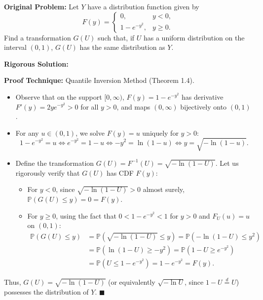 \documentclass[11pt, letterpaper]{article}
\theoremstyle{definition}
\theoremstyle{remark}
\newcommand{\Prob}{\mathbb{P}}
\begin{document}
\textbf{Original Problem:}
Let $Y$ have a distribution function given by
\[
    F(y) = \begin{cases} 0, & y < 0, \\ 1 - e^{-y^2}, & y \ge 0. \end{cases}
\]
Find a transformation $G(U)$ such that, if $U$ has a uniform distribution on the interval $(0, 1)$, $G(U)$ has the same distribution as $Y$.

\hrulefill

\textbf{Rigorous Solution:}

\textbf{Proof Technique:} Quantile Inversion Method (Theorem 1.4).
\begin{itemize}
    \item Observe that on the support $[0, \infty)$, $F(y) = 1 - e^{-y^2}$ has derivative $F'(y) = 2y e^{-y^2} > 0$ for all $y > 0$, and maps $(0, \infty)$ bijectively onto $(0, 1)$.
    \item For any $u \in (0, 1)$, we solve $F(y) = u$ uniquely for $y > 0$:
    \[
        1 - e^{-y^2} = u \iff e^{-y^2} = 1 - u \iff -y^2 = \ln(1 - u) \iff y = \sqrt{-\ln(1 - u)}.
    \]
    \item Define the transformation $G(U) = F^{-1}(U) = \sqrt{-\ln(1 - U)}$. Let us rigorously verify that $G(U)$ has CDF $F(y)$:
    \begin{itemize}
        \item For $y < 0$, since $\sqrt{-\ln(1 - U)} > 0$ almost surely, $\Prob(G(U) \le y) = 0 = F(y)$.
        \item For $y \ge 0$, using the fact that $0 < 1 - e^{-y^2} < 1$ for $y > 0$ and $F_U(u) = u$ on $(0, 1)$:
        \begin{align*}
            \Prob(G(U) \le y) &= \Prob\left(\sqrt{-\ln(1 - U)} \le y\right) = \Prob\left(-\ln(1 - U) \le y^2\right) \\
            &= \Prob\left(\ln(1 - U) \ge -y^2\right) = \Prob\left(1 - U \ge e^{-y^2}\right) \\
            &= \Prob\left(U \le 1 - e^{-y^2}\right) = 1 - e^{-y^2} = F(y).
        \end{align*}
    \end{itemize}
\end{itemize}
Thus, $G(U) = \sqrt{-\ln(1 - U)}$ (or equivalently $\sqrt{-\ln U}$, since $1 - U \stackrel{d}{=} U$) possesses the distribution of $Y$. \hfill $\blacksquare$

\end{document}

